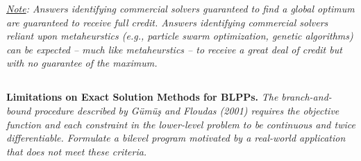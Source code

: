 \documentclass[12pt]{amsart}
\begin{document}
\textit{\underline{Note}: Answers identifying commercial solvers guaranteed to find a global optimum are guaranteed to receive full credit. Answers identifying commercial solvers reliant upon metaheurstics (e.g., particle swarm optimization, genetic algorithms) can be expected -- much like metaheurstics -- to receive a great deal of credit but with no guarantee of the
maximum.}



\subsection{}
\textbf{Limitations on Exact Solution Methods for BLPPs.} 
\textit{The branch-and-bound procedure described by Gümüş and Floudas (2001) requires the objective function and each constraint in the lower-level problem to be continuous and twice differentiable. Formulate a bilevel program motivated by a real-world application that does not meet these criteria.}
\end{document}
